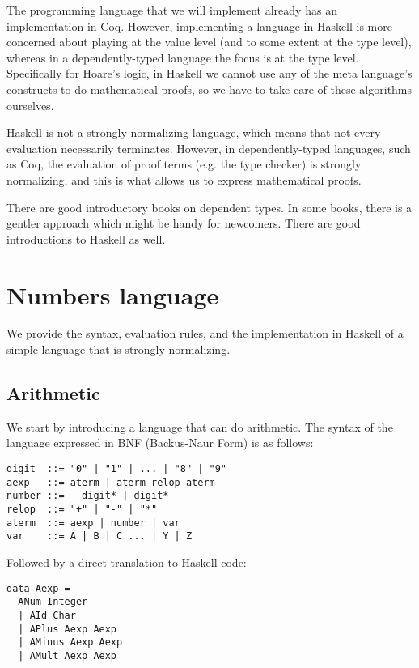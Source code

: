 \documentclass{article}
\begin{document}
The programming language that we will implement already has an implementation in Coq\cite{b3}. However, implementing a language in Haskell is more concerned about playing at the value level (and to some extent at the type level), whereas in a dependently-typed language the focus is at the type level. Specifically for Hoare's logic, in Haskell we cannot use any of the meta language's constructs to do mathematical proofs, so we have to take care of these algorithms ourselves.

Haskell is not a strongly normalizing language, which means that not every evaluation necessarily terminates. However, in dependently-typed languages, such as Coq\cite{b4}, the evaluation of proof terms (e.g. the type checker) is strongly normalizing, and this is what allows us to express mathematical proofs.

There are good introductory books on dependent types\cite{b3}. In some books, there is a gentler approach which might be handy for newcomers\cite{b5}. There are good introductions to Haskell as well\cite{b6}.

\section{Numbers language}

We provide the syntax, evaluation rules, and the implementation in Haskell of a simple language that is strongly normalizing.

\subsection{Arithmetic}

We start by introducing a language that can do arithmetic. The syntax of the language expressed in BNF (Backus-Naur Form) is as follows:

\begin{lstlisting}
digit  ::= "0" | "1" | ... | "8" | "9"
aexp   ::= aterm | aterm relop aterm
number ::= - digit* | digit*
relop  ::= "+" | "-" | "*"
aterm  ::= aexp | number | var
var    ::= A | B | C ... | Y | Z
\end{lstlisting}

Followed by a direct translation to Haskell code:

\begin{lstlisting}
data Aexp =
  ANum Integer
  | AId Char
  | APlus Aexp Aexp
  | AMinus Aexp Aexp
  | AMult Aexp Aexp
\end{lstlisting}
\end{document}
